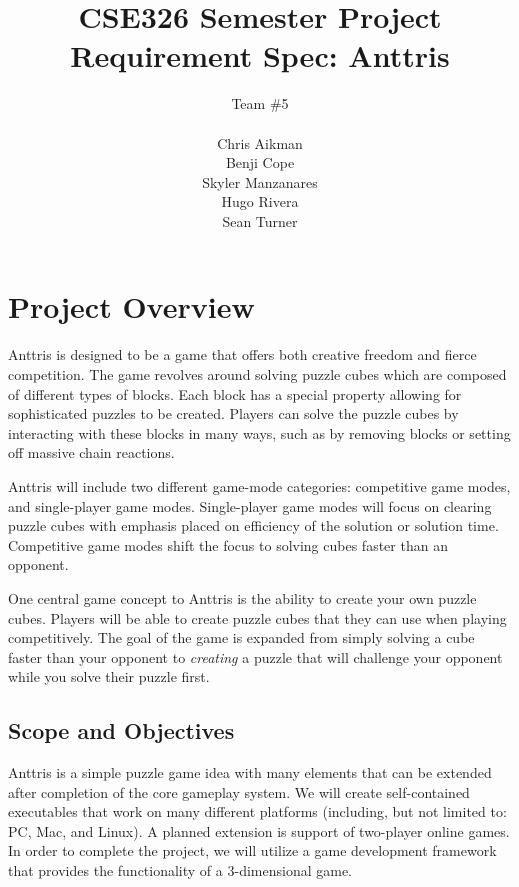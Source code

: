\documentclass[12pt]{article}
\begin{document}
\title{CSE326 Semester Project Requirement Spec: Anttris}
\author{Team \#5\\\\Chris Aikman\\Benji Cope\\Skyler Manzanares\\Hugo Rivera\\Sean Turner}
\maketitle
\section{Project Overview}\label{overview-SM}
Anttris is designed to be a game that offers both creative freedom and fierce competition. The game revolves around solving puzzle cubes which are composed of different types of blocks. Each block has a special property allowing for sophisticated puzzles to be created. Players can solve the puzzle cubes by interacting with these blocks in many ways, such as by removing blocks or setting off massive chain reactions.

Anttris will include two different game-mode categories: competitive game modes, and single-player game modes. Single-player game modes will focus on clearing puzzle cubes with emphasis placed on efficiency of the solution or solution time. Competitive game modes shift the focus to solving cubes faster than an opponent.

One central game concept to Anttris is the ability to create your own puzzle cubes. Players will be able to create puzzle cubes that they can use when playing competitively. The goal of the game is expanded from simply solving a cube faster than your opponent to \textsl{creating} a puzzle that will challenge your opponent while you solve their puzzle first.
\subsection{Scope and Objectives}\label{scope-obj-CA}
Anttris is a simple puzzle game idea with many elements that can be extended after completion of the core gameplay system. We will create self-contained executables that work on many different platforms (including, but not limited to: PC, Mac, and Linux). A planned extension is support of two-player online games.
In order to complete the project, we will utilize a game development framework that provides the functionality of a 3-dimensional game.
\end{document}
